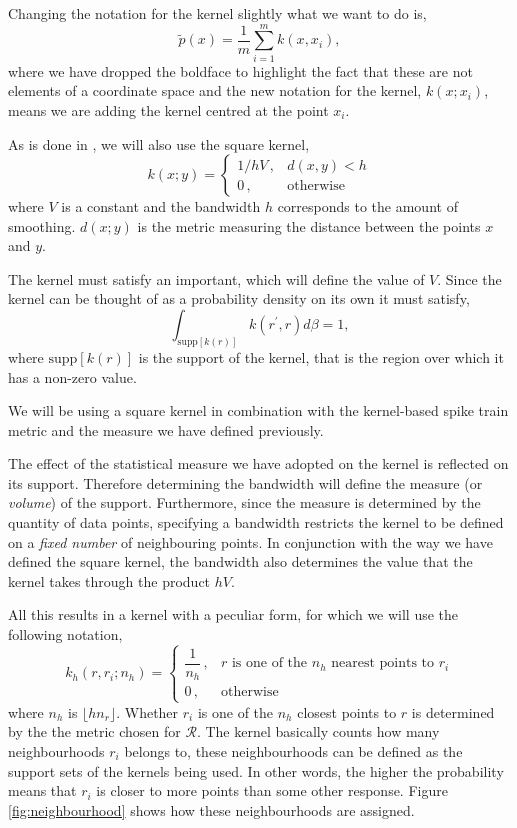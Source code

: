 \documentclass[10pt,a4paper]{book}
\begin{document}
Changing the notation for the kernel slightly what we want to do is,
\begin{equation}
\tilde{p}(x) = \dfrac{1}{m}\sum_{i = 1}^{m} k(x, x_i),
\end{equation}
where we have dropped the boldface to highlight the fact that these are not elements of a coordinate space and the new notation for the kernel, $k(x;x_i)$, means we are adding the kernel centred at the point $x_i$.

As is done in \cite{Houghton13}, we will also use the square kernel,
\begin{equation}
k(x;y) = 
\left\{
\begin{matrix}
1/hV\,, & d(x, y) < h\\
0\,, & \text{otherwise}
\end{matrix}
\right.
\end{equation}
where $V$ is a constant and the bandwidth $h$ corresponds to the amount of smoothing. $d(x;y)$ is the metric measuring the distance between the points $x$ and $y$.

The kernel must satisfy an important, which will define the value of $V$. Since the kernel can be thought of as a probability density on its own it must satisfy,
\begin{equation}
\int_{\text{supp}[k(r)]} k(r^{\prime}, r) d\beta = 1,
\end{equation}
where $\text{supp}[k(r)]$ is the support of the kernel, that is the region over which it has a non-zero value.

We will be using a square kernel in combination with the kernel-based spike train metric and the measure we have defined previously.

The effect of the statistical measure we have adopted on the kernel is reflected on its support. Therefore determining the bandwidth will define the measure (or \emph{volume}) of the support. Furthermore, since the measure is determined by the quantity of data points, specifying a bandwidth restricts the kernel to be defined on a \emph{fixed number} of neighbouring points. In conjunction with the way we have defined the square kernel, the bandwidth also determines the value that the kernel takes through the product $hV$.

All this results in a kernel with a peculiar form, for which we will use the following notation,
\begin{equation}
k_{h}(r, r_i;n_h) = 
\left\{
\begin{matrix}
\dfrac{1}{n_h}\,, & \text{$r$ is one of the $n_h$ nearest points to $r_i$} \\
0\,, &\text{otherwise}
\end{matrix}
\right.
\end{equation}
where $n_h$ is $\lfloor hn_r \rfloor$. Whether $r_i$ is one of the $n_h$ closest points to $r$ is determined by the the metric chosen for $\mathcal{R}$. The kernel basically counts how many neighbourhoods $r_i$ belongs to, these neighbourhoods can be defined as the support sets of the kernels being used. In other words, the higher the probability means that $r_i$ is closer to more points than some other response. Figure \ref{fig:neighbourhood} shows how these neighbourhoods are assigned.
\end{document}
